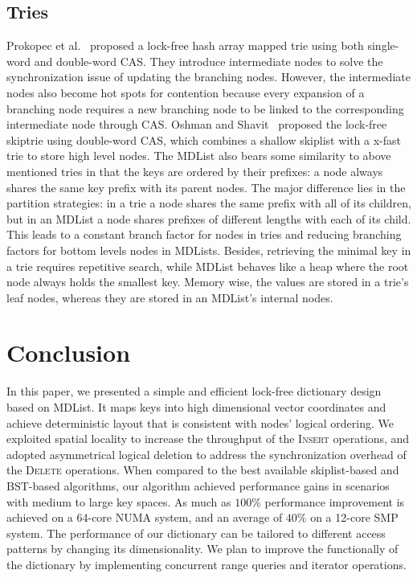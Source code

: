 \documentclass[10pt,conference,compsocconf]{IEEEtran}
\begin{document}
\subsection{Tries}
Prokopec et al.~\cite{prokopec2012concurrent} proposed a lock-free hash array mapped trie using both single-word and double-word CAS.
They introduce intermediate nodes to solve the synchronization issue of updating the branching nodes.
However, the intermediate nodes also become hot spots for contention because every expansion of a branching node requires a new branching node to be linked to the corresponding intermediate node through CAS.
Oshman and Shavit~\cite{oshman2013skiptrie} proposed the lock-free skiptrie using double-word CAS, which combines a shallow skiplist with a x-fast trie to store high level nodes.
The MDList also bears some similarity to above mentioned tries in that the keys are ordered by their prefixes: a node always shares the same key prefix with its parent nodes.
The major difference lies in the partition strategies: in a trie a node shares the same prefix with all of its children, but in an MDList a node shares prefixes of different lengths with each of its child. 
This leads to a constant branch factor for nodes in tries and reducing branching factors for bottom levels nodes in MDLists.
Besides, retrieving the minimal key in a trie requires repetitive search, while MDList behaves like a heap where the root node always holds the smallest key.
Memory wise, the values are stored in a trie's leaf nodes, whereas they are stored in an MDList's internal nodes.

\section{Conclusion}
\label{sec:conclusion}
In this paper, we presented a simple and efficient lock-free dictionary design based on MDList.
It maps keys into high dimensional vector coordinates and achieve deterministic layout that is consistent with nodes' logical ordering.
We exploited spatial locality to increase the throughput of the \textsc{Insert} operations, and adopted asymmetrical logical deletion to address the synchronization overhead of the \textsc{Delete} operations.
When compared to the best available skiplist-based and BST-based algorithms, our algorithm achieved performance gains in scenarios with medium to large key spaces.
As much as $100\%$ performance improvement is achieved on a 64-core NUMA system, and an average of $40\%$ on a 12-core SMP system.
The performance of our dictionary can be tailored to different access patterns by changing its dimensionality.
We plan to improve the functionally of the dictionary by implementing concurrent range queries and iterator operations.



\end{document}
